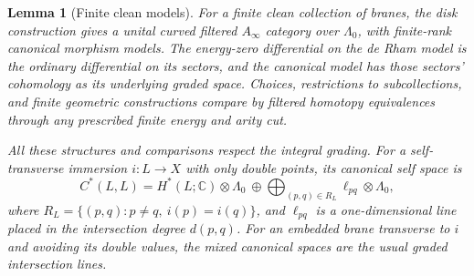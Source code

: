 \documentclass[11pt]{article}
\numberwithin{equation}{section}
\newtheorem{lemma}[theorem]{Lemma}
\theoremstyle{definition}
\theoremstyle{remark}
\begin{document}
\begin{lemma}[Finite clean models]
 \label{lem:finite-clean-models}
For a finite clean collection of branes, the disk construction gives a
unital curved filtered $A_\infty$ category over $\Lambda_0$, with
finite-rank canonical morphism models.  The energy-zero differential on
the de Rham model is the ordinary differential on its sectors, and the
canonical model has those sectors' cohomology as its underlying graded
space.  Choices, restrictions to subcollections, and finite geometric
constructions compare by filtered homotopy equivalences through any
prescribed finite energy and arity cut.

All these structures and comparisons respect the integral grading.
For a self-transverse immersion $i:L\to X$ with only double points, its
canonical self space is
\begin{equation}
 \label{eq:floer-self-space}
 C^*(L,L)=H^*(L;\mathbb C)\otimes\Lambda_0
 \ \oplus\!\bigoplus_{(p,q)\in R_L}
 \ell_{pq}\otimes\Lambda_0,
\end{equation}
where $R_L=\{(p,q):p\ne q,\ i(p)=i(q)\}$, and $\ell_{pq}$ is a
one-dimensional line placed in the intersection degree $d(p,q)$.
For an embedded brane transverse to $i$ and avoiding its double values,
the mixed canonical spaces are the usual graded intersection lines.
\end{lemma}
\end{document}

